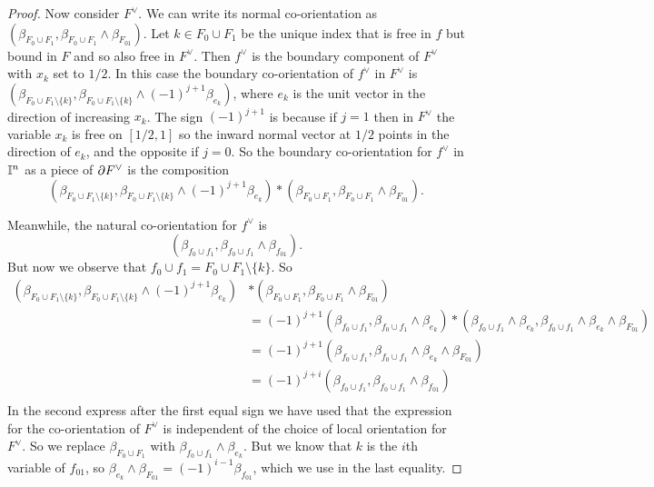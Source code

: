\begin{proof}
	Now consider $F^\vee$.
	We can write its normal co-orientation as $(\beta_{F_0 \cup F_1},\beta_{F_0 \cup F_1} \wedge \beta_{F_{01}})$.
	Let $k \in F_0 \cup F_1$ be the unique index that is free in $f$ but bound in $F$ and so also free in $F^\vee$.
	Then $f^\vee$ is the boundary component of $F^\vee$ with $x_k$ set to $1/2$.
	In this case the boundary co-orientation of $f^\vee$ in $F^\vee$ is $(\beta_{F_0 \cup F_1 \setminus \{k\}},\beta_{F_0 \cup F_1 \setminus \{k\}} \wedge (-1)^{j+1} \beta_{e_k})$, where $e_k$ is the unit vector in the direction of increasing $x_k$.
	The sign $(-1)^{j+1}$ is because if $j = 1$ then in $F^\vee$ the variable $x_k$ is free on $[1/2,1]$ so the inward normal vector at $1/2$ points in the direction of $e_k$, and the opposite if $j = 0$.
	So the boundary co-orientation for $f^\vee$ in $\mathbb{I}^n$ as a piece of $\partial F^\vee$ is the composition $$(\beta_{F_0 \cup F_1 \setminus \{k\}},\beta_{F_0 \cup F_1 \setminus \{k\}} \wedge (-1)^{j+1} \beta_{e_k})*(\beta_{F_0 \cup F_1},\beta_{F_0 \cup F_1} \wedge \beta_{F_{01}}).$$

	Meanwhile, the natural co-orientation for $f^\vee$ is $$(\beta_{f_0 \cup f_1},\beta_{f_0 \cup f_1} \wedge \beta_{f_{01}}).$$ But now we observe that $f_0 \cup f_1 = F_0 \cup F_1 \setminus \{k\}$.
	So
	\begin{align*}
		(\beta_{F_0 \cup F_1 \setminus \{k\}},\beta_{F_0 \cup F_1 \setminus \{k\}} \wedge (-1)^{j+1} \beta_{e_k})&*(\beta_{F_0 \cup F_1},\beta_{F_0 \cup F_1} \wedge \beta_{F_{01}})\\
		& = (-1)^{j+1}(\beta_{f_0 \cup f_1},\beta_{f_0 \cup f_1} \wedge \beta_{e_k})*(\beta_{f_0 \cup f_1} \wedge \beta_{e_k},\beta_{f_0 \cup f_1} \wedge \beta_{e_k} \wedge \beta_{F_{01}})\\
		& = (-1)^{j+1}(\beta_{f_0 \cup f_1},\beta_{f_0 \cup f_1} \wedge \beta_{e_k} \wedge \beta_{F_{01}})\\
		& = (-1)^{j+i}(\beta_{f_0 \cup f_1},\beta_{f_0 \cup f_1} \wedge \beta_{f_{01}})\\
	\end{align*}
	In the second express after the first equal sign we have used that the expression for the co-orientation of $F^\vee$ is independent of the choice of local orientation for $F^\vee$.
	So we replace $\beta_{F_0 \cup F_1}$ with $\beta_{f_0 \cup f_1} \wedge \beta_{e_k}$.
	But we know that $k$ is the $i$th variable of $f_{01}$, so
	$\beta_{e_k} \wedge \beta_{F_{01}} = (-1)^{i-1}\beta_{f_{01}}$, which we use in the last equality.
\end{proof}

